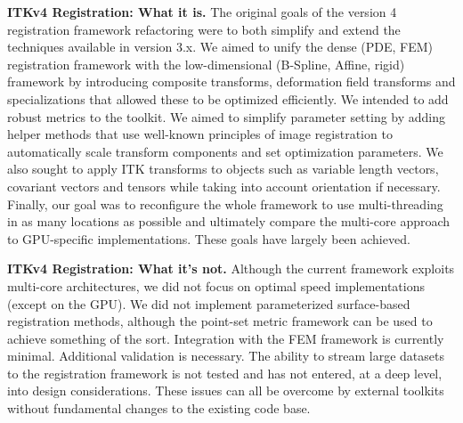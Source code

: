 \documentclass{article}
\begin{document}
{\bf ITKv4 Registration: What it is.}
The original goals of the version 4 registration framework refactoring
were to both simplify and extend the techniques available in version
3.x.  We aimed to unify the dense (PDE, FEM) registration framework
with the low-dimensional (B-Spline, Affine, rigid) framework by
introducing composite transforms, deformation field transforms and
specializations that allowed these to be optimized efficiently.  We
intended to add robust metrics to the toolkit.  We aimed to simplify
parameter setting by adding helper methods that use well-known
principles of image registration to automatically scale transform
components and set optimization parameters.  We also sought to apply
ITK transforms to objects such as variable length vectors, covariant
vectors and tensors while taking into account orientation if
necessary.  Finally, our goal was to reconfigure the whole framework
to use multi-threading in as many locations as possible and ultimately
compare the multi-core approach to GPU-specific implementations.
These goals have largely been achieved.  


{\bf ITKv4 Registration: What it's not.} Although the current
framework exploits multi-core architectures, we did not focus on
optimal speed implementations (except on the GPU).  We did not
implement parameterized surface-based registration methods, although
the point-set metric framework can be used to achieve something of the
sort.  Integration with the FEM framework is currently minimal.
Additional validation is necessary.  The ability to stream large
datasets to the registration framework is not tested and has not
entered, at a deep level, into design considerations.  These issues
can all be overcome by external toolkits without fundamental changes
to the existing code base.


\end{document}
